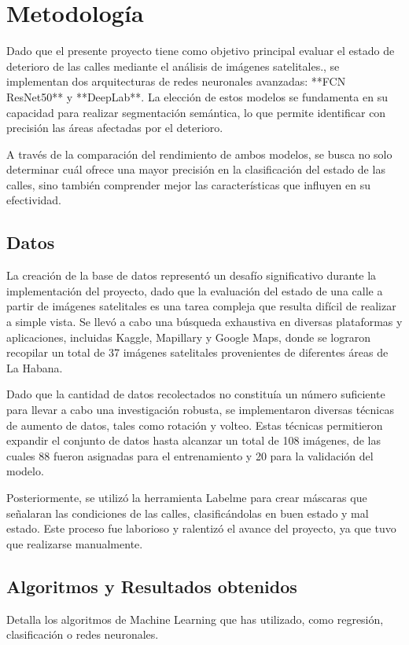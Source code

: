 \documentclass{article}
\begin{document}
\section{Metodología}
Dado que el presente proyecto tiene como objetivo principal evaluar el estado de deterioro de las calles mediante el análisis de imágenes satelitales., se implementan dos arquitecturas de redes neuronales avanzadas: **FCN ResNet50** y **DeepLab**. La elección de estos modelos se fundamenta en su capacidad para realizar segmentación semántica, lo que permite identificar con precisión las áreas afectadas por el deterioro.

A través de la comparación del rendimiento de ambos modelos, se busca no solo determinar cuál ofrece una mayor precisión en la clasificación del estado de las calles, sino también comprender mejor las características que influyen en su efectividad.
\subsection{Datos}
La creación de la base de datos representó un desafío significativo durante la implementación del proyecto, dado que la evaluación del estado de una calle a partir de imágenes satelitales es una tarea compleja que resulta difícil de realizar a simple vista. Se llevó a cabo una búsqueda exhaustiva en diversas plataformas y aplicaciones, incluidas Kaggle, Mapillary y Google Maps, donde se lograron recopilar un total de 37 imágenes satelitales provenientes de diferentes áreas de La Habana.

Dado que la cantidad de datos recolectados no constituía un número suficiente para llevar a cabo una investigación robusta, se implementaron diversas técnicas de aumento de datos, tales como rotación y volteo. Estas técnicas permitieron expandir el conjunto de datos hasta alcanzar un total de 108 imágenes, de las cuales 88 fueron asignadas para el entrenamiento y 20 para la validación del modelo.

Posteriormente, se utilizó la herramienta Labelme para crear máscaras que señalaran las condiciones de las calles, clasificándolas en buen estado y mal estado. Este proceso fue laborioso y ralentizó el avance del proyecto, ya que tuvo que realizarse manualmente.

\subsection{Algoritmos y Resultados obtenidos}
Detalla los algoritmos de Machine Learning que has utilizado, como regresión, clasificación o redes neuronales.
\end{document}
